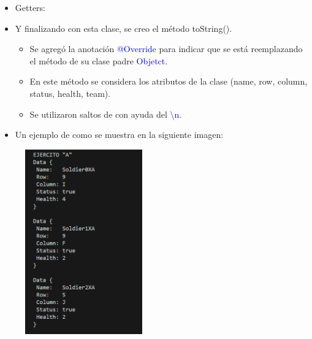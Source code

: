 \documentclass{article}
\begin{document}
        

        \begin{itemize}
            \begin{itemize}
                \item Getters: 
            \end{itemize}
        \end{itemize}

        

        \begin{itemize}
            \item Y finalizando con esta clase, se creo el método toString().
            \begin{itemize}
                \item Se agregó la anotación \textcolor{blue}{@Override} para indicar que se está reemplazando el método de su clase padre \textcolor{blue}{Objetct}.
                \item En este método se considera los atributos de la clase (name, row, column, status, health, team).
                \item Se utilizaron saltos de con ayuda del \textcolor{blue}{\textbackslash n}.
            \end{itemize}
        \end{itemize}

        

        \begin{itemize}
            \begin{itemize}
                \item Un ejemplo de como se muestra en la siguiente imagen:
            \end{itemize}
        \end{itemize}
            
        \begin{figure}[H]
            \centering
            \includegraphics[width=0.45\textwidth,keepaspectratio]{img/toString.png}
            \caption{}
        \end{figure}
     
\end{document}
